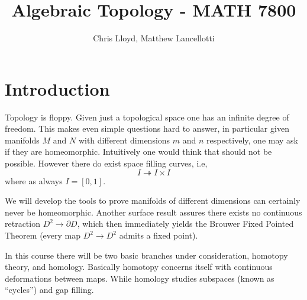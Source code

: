 \documentclass[11pt,leqno,oneside]{amsart}
\title[Algebraic Topology]{Algebraic Topology - MATH 7800}
\author{Chris Lloyd, Matthew Lancellotti}
\date{}
\numberwithin{thm}{subsection}
\begin{document}
\maketitle \newpage

\section{Introduction}

Topology is floppy. Given just a topological space one has an infinite
degree of freedom. This makes even simple questions hard to answer, in
particular given manifolds \(M\) and \(N\) with different dimensions
\(m\) and \(n\) respectively, one may ask if they are
homeomorphic. Intuitively one would think that should not be
possible. However there do exist space filling curves, i.e,
\[I \twoheadrightarrow I \times I\]
where as always \(I=[0,1]\). 

We will develop the tools to prove manifolds of different dimensions can
certainly never be homeomorphic. Another surface result assures there exists no continuous
retraction \(D^2 \to \partial D\), which then immediately yields the
Brouwer Fixed Pointed Theorem (every map \(D^2 \to D^2\) admits a
fixed point).

In this course there will be two basic branches under consideration,
homotopy theory, and homology. Basically homotopy concerns itself with
continuous deformations between maps. While homology studies subspaces
(known as ``cycles'') and gap filling.
\end{document}
